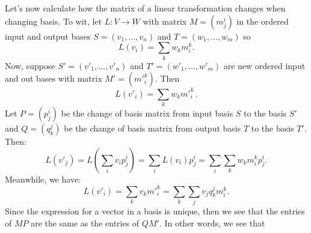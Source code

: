 Let's now calculate how the matrix of a linear transformation changes when changing basis.
To wit, let $L \colon V \longrightarrow W$ with matrix $M=(m^i_j)$ in the ordered input and output bases $S=(v_1, \ldots, v_n )$ and $T=(w_1,\ldots,w_m)$ so
\[
L(v_i) = \sum_k w_km^k_i.
\]
Now, suppose $S'=(v'_1, \ldots, v'_n )$ and $T'=(w'_1,\ldots,w'_m)$ are new  ordered input and out bases with matrix $M'=({m'}_i^k)$. Then
\[
L(v'_i)= \sum_k w_km'^k_i\, .
\]
Let $P=(p^i_j)$ be the change of basis matrix from input basis $S$ to the basis $S'$ and $Q=(q^j_k)$ be the change of basis matrix from output basis $T$ to the basis $T'$.  Then:
\[
L(v'_j)=L\left(\sum_i v_i p^i_j\right) = \sum_i L(v_i)p^i_j
= \sum_i \sum_k w_k m^k_i p^i_j.
\]
Meanwhile, we have:
\[
L(v'_i) = \sum_kv_km'^k_i = \sum_k \sum_j v_j q^j_km^k_i.
\]
Since the expression for a vector in a basis is unique, then we see that the entries of $MP$ are the same as the entries of $QM'$.  In other words, we see that

